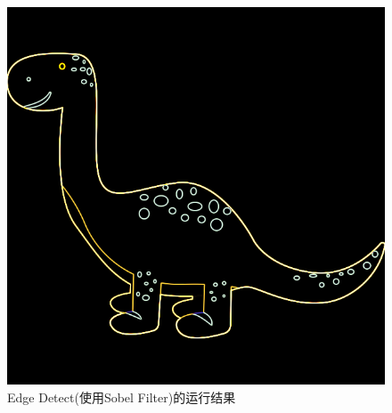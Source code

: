 \documentclass{ctexart}
\begin{document}
\begin{figure}[H]
    \centering\includegraphics[scale=0.4]{figure/EdgeDetection.png}
    \caption{Edge Detect(使用Sobel Filter)的运行结果}
\end{figure}
\end{document}
